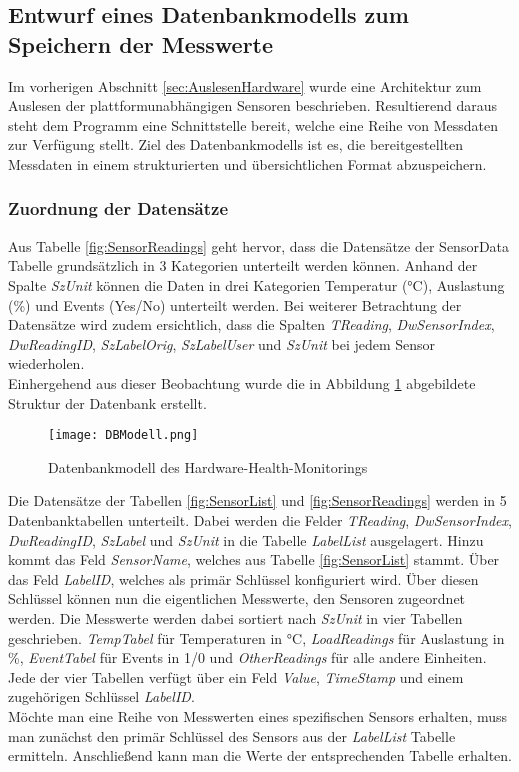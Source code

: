 \subsection{Entwurf eines Datenbankmodells zum Speichern der Messwerte}\label{sec:DatenbankModell}
Im vorherigen Abschnitt \ref{sec:AuslesenHardware} wurde eine Architektur zum Auslesen der plattformunabhängigen Sensoren beschrieben. Resultierend daraus steht dem Programm eine Schnittstelle bereit, welche eine Reihe von Messdaten zur Verfügung stellt. Ziel des Datenbankmodells ist es, die bereitgestellten Messdaten in einem strukturierten und übersichtlichen Format abzuspeichern.\\
\subsubsection*{Zuordnung der Datensätze}
Aus Tabelle \ref{fig:SensorReadings} geht hervor, dass die Datensätze der SensorData Tabelle grundsätzlich in 3 Kategorien unterteilt werden können. Anhand der Spalte \textit{SzUnit} können die Daten in drei Kategorien Temperatur (°C), Auslastung (\%) und Events (Yes/No) unterteilt werden. Bei weiterer Betrachtung der Datensätze wird zudem ersichtlich, dass die Spalten \textit{TReading}, \textit{DwSensorIndex}, \textit{DwReadingID}, \textit{SzLabelOrig}, \textit{SzLabelUser} und \textit{SzUnit} bei jedem Sensor wiederholen.\\
Einhergehend aus dieser Beobachtung wurde die in Abbildung \ref{fig:DBModell} abgebildete Struktur der Datenbank erstellt. 
\begin{center}
    \begin{figure}[h!]
        \centering
        \texttt{[image: DBModell.png]}
        \caption{Datenbankmodell des Hardware-Health-Monitorings}
        \label{fig:DBModell}
    \end{figure}
\end{center}
\vspace{-1.8cm}
Die Datensätze der Tabellen \ref{fig:SensorList} und \ref{fig:SensorReadings} werden in 5 Datenbanktabellen unterteilt. Dabei werden die Felder \textit{TReading}, \textit{DwSensorIndex}, \textit{DwReadingID}, \textit{SzLabel} und \textit{SzUnit} in die Tabelle \textit{LabelList} ausgelagert. Hinzu kommt das Feld \textit{SensorName}, welches aus Tabelle \ref{fig:SensorList} stammt. Über das Feld \textit{LabelID}, welches als primär Schlüssel konfiguriert wird. Über diesen Schlüssel können nun die eigentlichen Messwerte, den Sensoren zugeordnet werden. Die Messwerte werden dabei sortiert nach \textit{SzUnit} in vier Tabellen geschrieben. \textit{TempTabel} für Temperaturen in  °C, \textit{LoadReadings} für Auslastung in \%, \textit{EventTabel} für Events in 1/0 und \textit{OtherReadings} für alle andere Einheiten. Jede der vier Tabellen verfügt über ein Feld \textit{Value}, \textit{TimeStamp} und einem zugehörigen Schlüssel \textit{LabelID}.\\
Möchte man eine Reihe von Messwerten eines spezifischen Sensors erhalten, muss man zunächst den primär Schlüssel des Sensors aus der \textit{LabelList} Tabelle ermitteln. Anschließend kann man die Werte der entsprechenden Tabelle erhalten.
